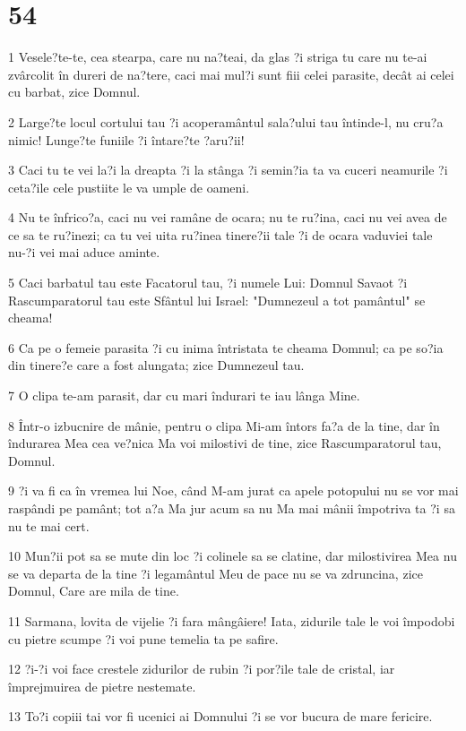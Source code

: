 \chapter{54}

\par 1 Vesele?te-te, cea stearpa, care nu na?teai, da glas ?i striga tu care nu te-ai zvârcolit în dureri de na?tere, caci mai mul?i sunt fiii celei parasite, decât ai celei cu barbat, zice Domnul.
\par 2 Large?te locul cortului tau ?i acoperamântul sala?ului tau întinde-l, nu cru?a nimic! Lunge?te funiile ?i întare?te ?aru?ii!
\par 3 Caci tu te vei la?i la dreapta ?i la stânga ?i semin?ia ta va cuceri neamurile ?i ceta?ile cele pustiite le va umple de oameni.
\par 4 Nu te înfrico?a, caci nu vei ramâne de ocara; nu te ru?ina, caci nu vei avea de ce sa te ru?inezi; ca tu vei uita ru?inea tinere?ii tale ?i de ocara vaduviei tale nu-?i vei mai aduce aminte.
\par 5 Caci barbatul tau este Facatorul tau, ?i numele Lui: Domnul Savaot ?i Rascumparatorul tau este Sfântul lui Israel: "Dumnezeul a tot pamântul" se cheama!
\par 6 Ca pe o femeie parasita ?i cu inima întristata te cheama Domnul; ca pe so?ia din tinere?e care a fost alungata; zice Dumnezeul tau.
\par 7 O clipa te-am parasit, dar cu mari îndurari te iau lânga Mine.
\par 8 Într-o izbucnire de mânie, pentru o clipa Mi-am întors fa?a de la tine, dar în îndurarea Mea cea ve?nica Ma voi milostivi de tine, zice Rascumparatorul tau, Domnul.
\par 9 ?i va fi ca în vremea lui Noe, când M-am jurat ca apele potopului nu se vor mai raspândi pe pamânt; tot a?a Ma jur acum sa nu Ma mai mânii împotriva ta ?i sa nu te mai cert.
\par 10 Mun?ii pot sa se mute din loc ?i colinele sa se clatine, dar milostivirea Mea nu se va departa de la tine ?i legamântul Meu de pace nu se va zdruncina, zice Domnul, Care are mila de tine.
\par 11 Sarmana, lovita de vijelie ?i fara mângâiere! Iata, zidurile tale le voi împodobi cu pietre scumpe ?i voi pune temelia ta pe safire.
\par 12 ?i-?i voi face crestele zidurilor de rubin ?i por?ile tale de cristal, iar împrejmuirea de pietre nestemate.
\par 13 To?i copiii tai vor fi ucenici ai Domnului ?i se vor bucura de mare fericire.
